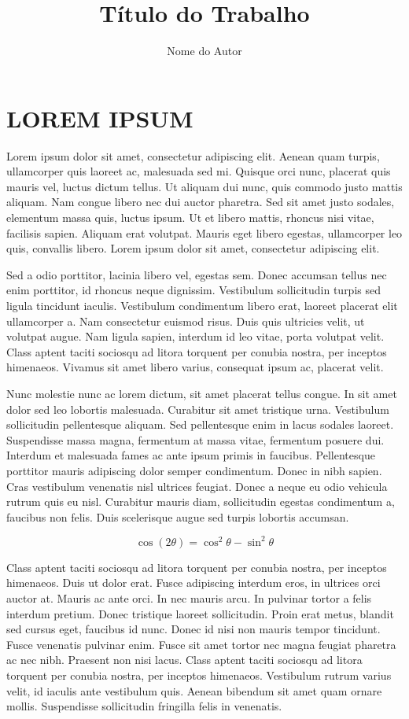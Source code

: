 \documentclass[xindy,acronym,symbols]{fei}
\author{Nome do Autor}
\title{Título do Trabalho}
\begin{document}
\chapter{LOREM IPSUM}

Lorem ipsum dolor sit amet, consectetur adipiscing elit. Aenean quam turpis, ullamcorper quis laoreet ac, malesuada sed mi. Quisque orci nunc, placerat quis mauris vel, luctus dictum tellus. Ut aliquam dui nunc, quis commodo justo mattis aliquam. Nam congue libero nec dui auctor pharetra. Sed sit amet justo sodales, elementum massa quis, luctus ipsum. Ut et libero mattis, rhoncus nisi vitae, facilisis sapien. Aliquam erat volutpat. Mauris eget libero egestas, ullamcorper leo quis, convallis libero. Lorem ipsum dolor sit amet, consectetur adipiscing elit.

Sed a odio porttitor, lacinia libero vel, egestas sem. Donec accumsan tellus nec enim porttitor, id rhoncus neque dignissim. Vestibulum sollicitudin turpis sed ligula tincidunt iaculis. Vestibulum condimentum libero erat, laoreet placerat elit ullamcorper a. Nam consectetur euismod risus. Duis quis ultricies velit, ut volutpat augue. Nam ligula sapien, interdum id leo vitae, porta volutpat velit. Class aptent taciti sociosqu ad litora torquent per conubia nostra, per inceptos himenaeos. Vivamus sit amet libero varius, consequat ipsum ac, placerat velit.

Nunc molestie nunc ac lorem dictum, sit amet placerat tellus congue. In sit amet dolor sed leo lobortis malesuada. Curabitur sit amet tristique urna. Vestibulum sollicitudin pellentesque aliquam. Sed pellentesque enim in lacus sodales laoreet. Suspendisse massa magna, fermentum at massa vitae, fermentum posuere dui. Interdum et malesuada fames ac ante ipsum primis in faucibus. Pellentesque porttitor mauris adipiscing dolor semper condimentum. Donec in nibh sapien. Cras vestibulum venenatis nisl ultrices feugiat. Donec a neque eu odio vehicula rutrum quis eu nisl. Curabitur mauris diam, sollicitudin egestas condimentum a, faucibus non felis. Duis scelerisque augue sed turpis lobortis accumsan.

\begin{equation}
\cos (2\theta) = \cos^2 \theta - \sin^2 \theta
\end{equation}

Class aptent taciti sociosqu ad litora torquent per conubia nostra, per inceptos himenaeos. Duis ut dolor erat. Fusce adipiscing interdum eros, in ultrices orci auctor at. Mauris ac ante orci. In nec mauris arcu. In pulvinar tortor a felis interdum pretium. Donec tristique laoreet sollicitudin. Proin erat metus, blandit sed cursus eget, faucibus id nunc. Donec id nisi non mauris tempor tincidunt. Fusce venenatis pulvinar enim. Fusce sit amet tortor nec magna feugiat pharetra ac nec nibh. Praesent non nisi lacus. Class aptent taciti sociosqu ad litora torquent per conubia nostra, per inceptos himenaeos. Vestibulum rutrum varius velit, id iaculis ante vestibulum quis. Aenean bibendum sit amet quam ornare mollis. Suspendisse sollicitudin fringilla felis in venenatis.
\end{document}
